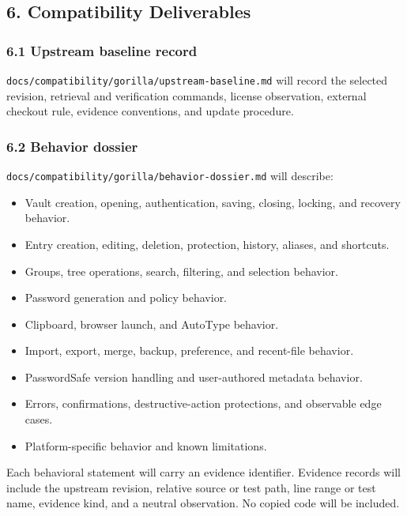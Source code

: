 \documentclass[
  letterpaper,
]{article}
\providecommand{\tightlist}{%
  \setlength{\itemsep}{0pt}\setlength{\parskip}{0pt}}
\begin{document}
\subsection{6. Compatibility Deliverables}\label{6-compatibility-deliverables}

\subsubsection{6.1 Upstream baseline record}\label{61-upstream-baseline-record}

\nolinkurl{docs/compatibility/gorilla/upstream-baseline.md} will record the selected revision, retrieval and
verification commands, license observation, external checkout rule, evidence conventions, and update procedure.

\subsubsection{6.2 Behavior dossier}\label{62-behavior-dossier}

\nolinkurl{docs/compatibility/gorilla/behavior-dossier.md} will describe:

\begin{itemize}
\tightlist
\item
  Vault creation, opening, authentication, saving, closing, locking, and recovery behavior.
\item
  Entry creation, editing, deletion, protection, history, aliases, and shortcuts.
\item
  Groups, tree operations, search, filtering, and selection behavior.
\item
  Password generation and policy behavior.
\item
  Clipboard, browser launch, and AutoType behavior.
\item
  Import, export, merge, backup, preference, and recent-file behavior.
\item
  PasswordSafe version handling and user-authored metadata behavior.
\item
  Errors, confirmations, destructive-action protections, and observable edge cases.
\item
  Platform-specific behavior and known limitations.
\end{itemize}

Each behavioral statement will carry an evidence identifier. Evidence records will include the upstream revision,
relative source or test path, line range or test name, evidence kind, and a neutral observation. No copied code will be
included.
\end{document}
